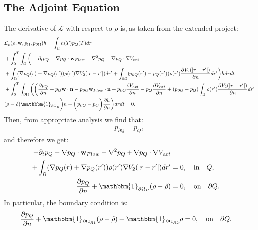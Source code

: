 \documentclass[11pt, a4paper]{article}
\newcommand{\Sta}{\rho}
\newcommand{\Adja}{{p}_Q}
\newcommand{\Adjc}{p_{\partial Q}}
\theoremstyle{definition}
\begin{document}
\subsection*{The Adjoint Equation}
The derivative of $\mathcal{L}$ with respect to $\rho$ is, as taken from the extended project:
\begin{align*}
&\mathcal{L}_\rho (\rho,\mathbf{w},p_\Omega,p_{\partial \Omega})h=
\int_\Omega h(T) \Adja(T) dr\\
&+ \int_0^T \int_\Omega \bigg(   - \partial_t \Adja  - \nabla \Adja \cdot \mathbf{w}_{Flow}  - \nabla^2 \Adja \notag 
+  \nabla \Adja \cdot \nabla V_{ext}  \notag \\
&+ \int_\Omega (\nabla  \Adja(r)+\nabla  \Adja(r')) \rho(r') \nabla V_2(|r-r'|) dr'+ \int_{\partial \Omega} ( \Adjc(r') - \Adja(r')) \rho(r')   \frac{\partial V_2(|r-r'|)}{\partial n} dr' \bigg) h dr dt \\
&+  \int_0^T\int_{\partial \Omega}  \bigg(
\bigg(\frac{\partial \Adja }{\partial n} + \Adja  \mathbf{w} \cdot \mathbf{n} - \Adjc \mathbf{w}_{Flow} \cdot \mathbf{n}  +  \Adjc \dfrac{\partial V_{ext}}{\partial n} - \Adja \frac{\partial V_{ext}}{\partial n} + ( \Adjc - \Adja)  \int_\Omega \rho(r') \frac{\partial V_2(|r-r'|)}{\partial n} dr' \\
&(\rho- \hat{\rho})\mathbbm{1}_{\partial \Omega_R} \bigg)h + \bigg( \Adjc- \Adja \bigg) \frac{\partial h}{\partial n} \bigg) dr dt =0.
\end{align*}
Then, from appropriate analysis we find that:
\begin{align*}
\Adjc = \Adja,
\end{align*}
and therefore we get:
\begin{align*}
   - \partial_t  \Adja  - \nabla \Adja \cdot \mathbf{w}_{Flow}  - \nabla^2 \Adja \notag 
+  \nabla \Adja \cdot \nabla V_{ext}  \notag \\
+ \int_\Omega (\nabla  \Adja(r)+\nabla  \Adja(r')) \rho(r') \nabla V_2(|r-r'|) dr' &=0, \quad \text{in} \quad Q, \\
\frac{\partial \Adja }{\partial n} + \mathbbm{1}_{\partial \Omega_R} (\rho- \hat{\rho})&=0, \quad \text{on} \quad \partial Q.
\end{align*}
In particular, the boundary condition is:
\begin{align*}
\frac{\partial \Adja }{\partial n} +\mathbbm{1}_{\partial \Omega_{R1}} (\Sta -\tilde \Sta)  +\mathbbm{1}_{\partial \Omega_{R2}} \Sta
&=0, \quad \text{on} \quad \partial Q.
\end{align*}
\end{document}
